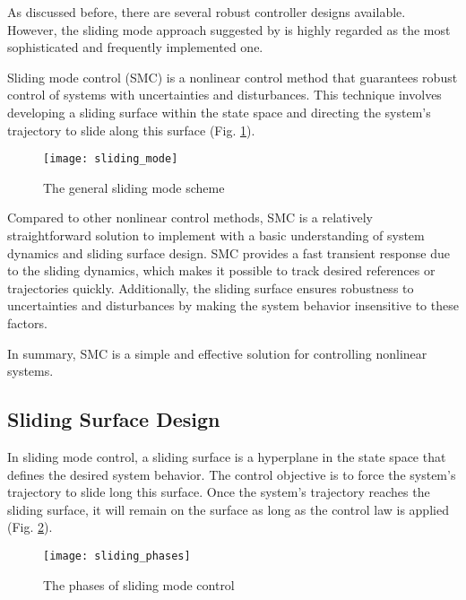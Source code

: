     As discussed before, there are several robust controller
    designs available. However, the sliding mode approach suggested by 
    is highly regarded as the most sophisticated and frequently implemented one.

    Sliding mode control (SMC) is a nonlinear control method that guarantees
    robust control of systems with uncertainties and disturbances.
    This technique involves developing a sliding surface within the state
    space and directing the system's trajectory to slide along this surface (Fig. \ref{image:sliding_mode}).

    \begin{figure}[H]
        \centering\texttt{[image: sliding\_mode]}
        \caption{The general sliding mode scheme}
        \label{image:sliding_mode}
    \end{figure}

    Compared to other nonlinear control methods, SMC is a relatively straightforward
    solution to implement with a basic understanding of system dynamics and sliding
    surface design. SMC provides a fast transient response due to the sliding dynamics, which makes 
    it possible to track desired references or trajectories quickly. Additionally, 
    the sliding surface ensures robustness to uncertainties and disturbances by 
    making the system behavior insensitive to these factors. 
    
    In summary, SMC is a simple and effective solution for controlling nonlinear systems.

\subsection{Sliding Surface Design}

    In sliding mode control, a sliding surface is a hyperplane in
    the state space that defines the desired system behavior.
    The control objective is to force the system's trajectory to slide
    long this surface. Once the system's trajectory reaches the sliding surface,
    it will remain on the surface as long as the control law is applied (Fig. \ref{image:sliding_phases}).

    \begin{figure}[H]
        \centering\texttt{[image: sliding\_phases]}
        \caption{The phases of sliding mode control}
        \label{image:sliding_phases}
    \end{figure}

